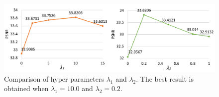 \begin{figure}[t]
	\centering
	\includegraphics[width=1.0\columnwidth]{lamda1} %
	\caption{Comparison of hyper parameters $\lambda_1$ and $\lambda_2$. The best result is obtained when $\lambda_1=10.0$ and $\lambda_2=0.2$.}
	\label{fig:hparam}
\end{figure}






 

